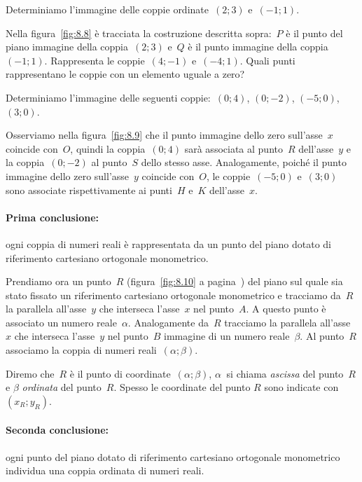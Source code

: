 \begin{exrig}
 \begin{esempio}
 \label{ex:8.12}
Determiniamo l'immagine delle coppie ordinate~$(2;3)$ e~$(-1;1)$.

Nella figura~\ref{fig:8.8} è tracciata la costruzione descritta sopra:~$P$ è il punto del piano immagine della coppia~$(2;3)$ e~$Q$
è il punto immagine della coppia~$(-1;1)$. Rappresenta le coppie~$(4;-1)$ e~$(-4;1)$.
Quali punti rappresentano le coppie con un elemento uguale a zero?
 \end{esempio}

 \begin{esempio}
 \label{ex:8.13}
Determiniamo l'immagine delle seguenti coppie:~$(0;4)$, $(0;-2)$, $(-5;0)$, $(3;0)$.

Osserviamo nella figura~\ref{fig:8.9} che il punto immagine dello zero sull'asse~$x$ coincide con~$O$, quindi la coppia~$(0;4)$ sarà associata al punto~$R$
dell'asse~$y$ e la coppia~$(0;-2)$ al punto~$S$ dello stesso asse. Analogamente, poiché il punto immagine dello zero sull'asse~$y$
coincide con~$O$, le coppie~$(-5;0)$ e~$(3;0)$ sono associate rispettivamente ai punti~$H$ e~$K$ dell'asse~$x$.
 \end{esempio}
\end{exrig}

\paragraph{Prima conclusione:} ogni coppia di numeri reali è rappresentata da un punto del piano dotato di riferimento cartesiano ortogonale
monometrico.

Prendiamo ora un punto~$R$ (figura~\ref{fig:8.10} a pagina~\pageref{fig:8.10}) del piano sul quale sia stato fissato un riferimento cartesiano ortogonale monometrico e tracciamo da~$R$
la parallela all'asse~$y$ che interseca l'asse~$x$ nel punto~$A$. A questo punto è associato un numero reale~$\alpha$.
Analogamente da~$R$ tracciamo la parallela all'asse~$x$ che interseca l'asse~$y$ nel punto~$B$ immagine di un numero reale~$\beta$.
Al punto~$R$ associamo la coppia di numeri reali~$(\alpha; \beta)$.

Diremo che~$R$ è il punto di coordinate~$(\alpha;\beta )$, $\alpha~$ si chiama \emph{ascissa} del punto~$R$ e $\beta$ \emph{ordinata}
del punto~$R$. Spesso le coordinate del punto $R$ sono indicate con $(x_R;y_R)$.

\paragraph{Seconda conclusione:} ogni punto del piano dotato di riferimento cartesiano ortogonale monometrico individua una coppia ordinata
di numeri reali.

